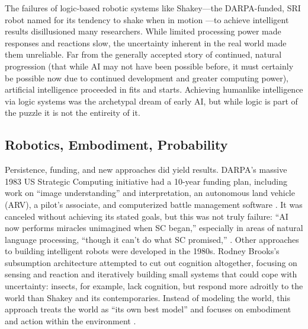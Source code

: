 The failures of logic-based robotic systems like Shakey---the
DARPA-funded, SRI
robot named for its tendency to shake when in motion \cite[Ch.
  10]{mccorduck}---to achieve intelligent results disillusioned many
researchers. While limited processing power made responses and reactions slow, the
uncertainty inherent in the real world made them unreliable. Far from
the generally accepted story of continued, natural 
progression (that while AI may not have been possible before, it must
certainly be possible now due to continued development and greater
computing power), artificial intelligence proceeded in fits and
starts. Achieving humanlike intelligence via logic 
systems was the archetypal dream of early AI, but while logic is
part of the puzzle it is not the entireity of it.


\subsection{Robotics, Embodiment, Probability}

Persistence, funding, and new approaches did yield results.
DARPA's massive 1983 US Strategic Computing initiative had a 10-year
funding plan, including work on ``image understanding'' and
interpretation, an autonomous land vehicle (ARV), a pilot's associate,
and computerized battle management software \cite{rolandShiman}. It
was canceled without 
achieving its stated goals, but this was not truly failure: ``AI now
performs miracles unimagined when SC 
began,'' especially in areas of natural language processing, ``though
it can't do what SC promised,'' \cite[p. 328]{rolandShiman}. Other
approaches to building intelligent robots were developed in the 1980s. Rodney 
Brooks's subsumption architecture \cite[p.
  353]{mobilebrooks} attempted to cut out 
cognition altogether, focusing on sensing and reaction and iteratively
building small systems that could cope with uncertainty:
insects, for example, lack cognition, but respond more adroitly to the
world than Shakey and its contemporaries. Instead of modeling the
world, this approach treats
the world as ``its own best model'' and focuses on embodiment and action
within the environment \cite[p. 256]{ekbia}.

